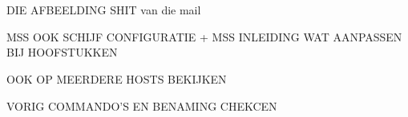 \chapter{}
\label{ch:basisconf}

DIE AFBEELDING SHIT van die mail

MSS OOK SCHIJF CONFIGURATIE + MSS INLEIDING WAT AANPASSEN BIJ HOOFSTUKKEN

OOK OP MEERDERE HOSTS BEKIJKEN

VORIG COMMANDO'S EN BENAMING CHEKCEN